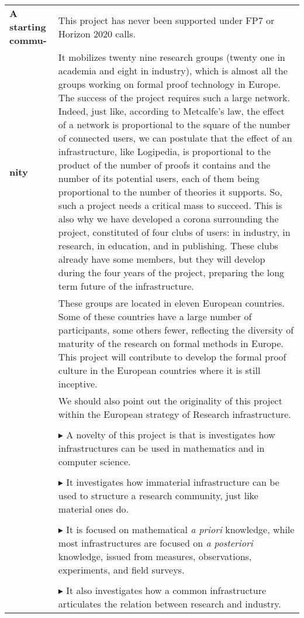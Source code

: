 \begin{longtable}{|p{}|p{}|}
{\bf A starting commu-}
&
This project has never been supported under FP7 or Horizon 2020 calls.\\
{\bf nity} &
\hspace{0.4cm} It mobilizes twenty nine research groups (twenty one in
academia and eight in industry), which is
almost all the groups working on formal proof technology in Europe.
The success of the project requires such a large network.  Indeed,
just like, according to Metcalfe's law, the effect of a network is
proportional to the square of the number of connected users, we can
postulate that the effect of an infrastructure, like Logipedia, is
proportional to the product of the number of proofs it contains and
the number of its potential users, each of them being proportional to
the number of theories it supports. So, such a project needs a
critical mass to succeed. This is also why we have developed a corona
surrounding the project, constituted of four clubs of users: in
industry, in research, in education, and in publishing. These clubs
already have some members, but they will develop during the four years
of the project, preparing the long term future of the infrastructure.\\
&
\hspace{0.4cm}
These groups are located in eleven European countries.  Some of these
countries have a large number of participants, some others fewer,
reflecting the diversity of maturity of the research on formal methods
in Europe. This project will contribute to develop the formal proof
culture in the European countries where it is still inceptive.\\
&
\hspace{0.4cm}
We should also point out the originality of this project within the
European strategy of Research infrastructure.\\
&\\
&
$\blacktriangleright$ A novelty of this project is that is
investigates how infrastructures can be used in mathematics and in
computer science.\\
&\\
&
$\blacktriangleright$ It investigates how immaterial infrastructure
can be used to structure a research community, just like material ones
do.\\
&\\
&
$\blacktriangleright$ It is focused on mathematical {\em a priori}
knowledge, while most infrastructures are focused on {\em a
  posteriori} knowledge, issued from measures, observations,
experiments, and field surveys.\\
&\\
&
$\blacktriangleright$ It also investigates how a common infrastructure
articulates the relation between research and industry.\\


\end{longtable}
